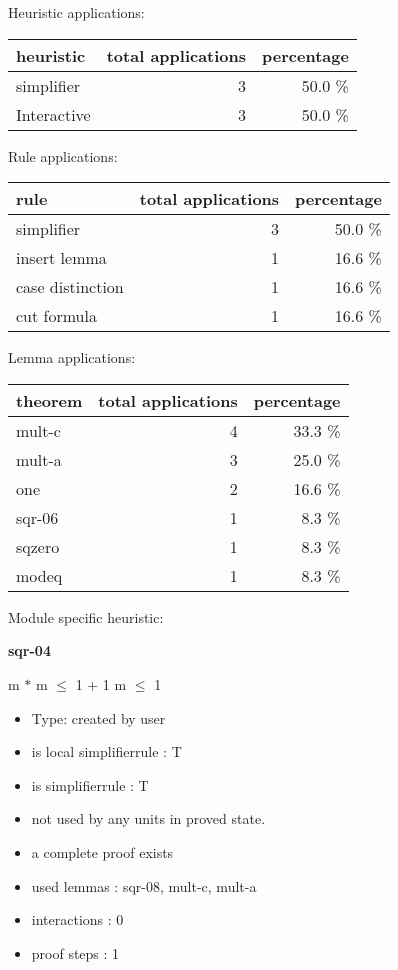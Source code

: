 \documentclass[a4paper]{article}
\begin{document}
\medskip


Heuristic applications:

\begin{supertabular}{l|r|r}
heuristic	& total applications & percentage \\ \hline
simplifier & 3 & 50.0 \% \\
Interactive & 3 & 50.0 \% \\

\end{supertabular}

Rule applications:

\begin{supertabular}{l|r|r}
rule	        & total applications & percentage \\ \hline
simplifier & 3 & 50.0 \% \\
insert lemma & 1 & 16.6 \% \\
case distinction & 1 & 16.6 \% \\
cut formula & 1 & 16.6 \% \\

\end{supertabular}

Lemma applications:

\begin{supertabular}{l|r|r}
theorem	        & total applications & percentage \\ \hline
mult-c & 4 & 33.3 \% \\
mult-a & 3 & 25.0 \% \\
one & 2 & 16.6 \% \\
sqr-06 & 1 & 8.3 \% \\
sqzero & 1 & 8.3 \% \\
modeq & 1 & 8.3 \% \\

\end{supertabular}

Module specific heuristic:

\pagebreak

{\LARGE\bf sqr-04}\label{lemma-sqr-04}

\medskip

 \Fol m $*$ m $\le$ 1 + 1 \Equiv m $\le$ 1

\begin{itemize}

\item Type: created by user

\item is local simplifierrule : T
\item is simplifierrule : T
\item not used by any units in proved state.
\item       a complete proof exists
\item       used lemmas  : sqr-08, mult-c, mult-a
\item       interactions : 0
\item       proof steps  : 1
\end{itemize}
\end{document}
